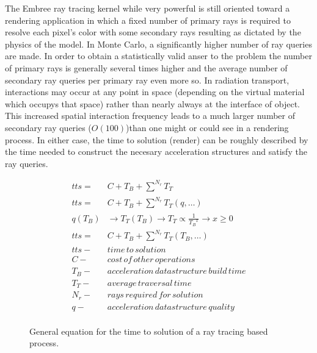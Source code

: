 \documentclass[10pt, a4paper]{article}
\begin{document}
The Embree ray tracing kernel while very powerful is still oriented toward a rendering application in which a fixed number of primary rays is required to resolve each pixel's color with some secondary rays resulting as dictated by the physics of the model. In Monte Carlo, a significantly higher number of ray queries are made. In order to obtain a statistically valid anser to the problem the number of primary rays is generally several times higher and the average number of secondary ray queries per primary ray even more so. In radiation transport, interactions may occur at any point in space (depending on the virtual material which occupys that space) rather than nearly always at the interface of object. This increased spatial interaction frequency leads to a much larger number of secondary ray queries ($O(100)$)than one might or could see in a rendering process. In either case, the time to solution (render) can be roughly described by the time needed to construct the necesary acceleration structures and satisfy the ray queries.

\begin{figure}[H]
  \centering
  \caption{General equation for the time to solution of a ray tracing based process.}
  \label{tts_eq}
  \begin{align*}
    tts = & C + T_{B} + \sum_{}^{N_{r}} T_{T} \\
    tts = & C + T_{B} + \sum_{}^{N_{r}} T_{T}(q,\ldots) \\
    q(T_{B}) & \rightarrow T_{T}(T_{B}) \rightarrow T_{T} \propto \frac{1}{{T_{B}}^{x}} \rightarrow x \geq 0 \\
    tts = & C + T_{B} + \sum_{}^{N_{r}} T_{T}(T_{B},\ldots) \\
    tts - & time\, to\, solution \\
    C - & cost\, of\, other\, operations \\
    T_{B} - & acceleration\, datastructure\, build\, time \\
    T_{T} - & average\, traversal\, time \\
    N_{r} - & rays\, required\, for\, solution \\
    q - & acceleration\, datastructure\, quality \\
  \end{align*}
\end{figure}
\end{document}
